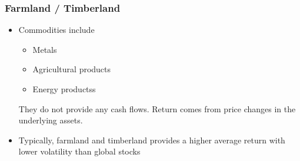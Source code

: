 \documentclass[../notes_compiled.tex]{subfiles}
\begin{document}
\subsubsection{Farmland / Timberland}
\begin{itemize}
\item Commodities include
\begin{multicols}{3}
\begin{itemize}
\item Metals
\item Agricultural products
\item Energy productss
\end{itemize}
\end{multicols}
They do not provide any cash flows. Return comes from price changes in the underlying assets.
\item Typically, farmland and timberland provides a higher average return with lower volatility than global stocks
\end{itemize}
\end{document}
